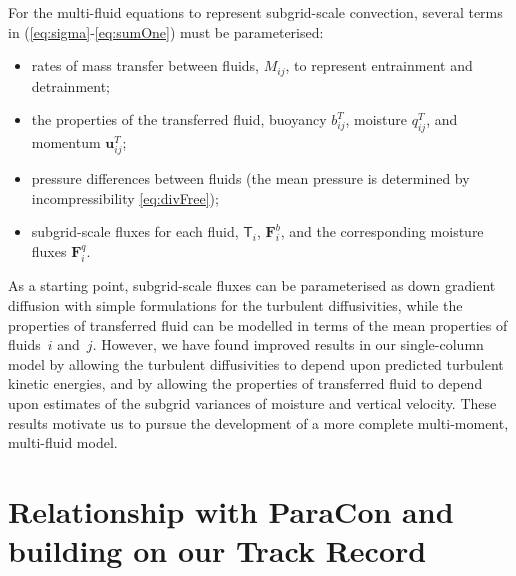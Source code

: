 \documentclass[11pt,a4paper]{article}
\begin{document}
For the multi-fluid equations to represent subgrid-scale convection, several terms in (\ref{eq:sigma}-\ref{eq:sumOne}) must be parameterised:
\begin{itemize}
\item rates of mass transfer between fluids, $M_{ij}$, to represent entrainment and detrainment;
\item the properties of the transferred fluid, buoyancy $b_{ij}^T$, moisture $q_{ij}^T$, and momentum $\mathbf{u}_{ij}^T$; 
\item pressure differences between fluids (the mean pressure is determined by incompressibility \eqref{eq:divFree});
\item subgrid-scale fluxes for each fluid, $\mathsf{T}_i$, $\mathbf{F}^b_{i}$, and the corresponding moisture fluxes $\mathbf{F}^q_{i}$.
\end{itemize}

As a starting point, subgrid-scale fluxes can be parameterised as down gradient diffusion with simple formulations for the turbulent diffusivities,
while the properties of transferred fluid can be modelled in terms of the mean properties of fluids~$i$ and~$j$. 
However, we have found improved results in our single-column model by allowing the turbulent diffusivities to depend upon predicted turbulent
kinetic energies, and by allowing the properties of transferred fluid to depend upon estimates of the subgrid variances of moisture and vertical velocity.
These results motivate us to pursue the development of a more complete multi-moment, multi-fluid model.

\section{Relationship with ParaCon and building on our Track Record}
\end{document}
